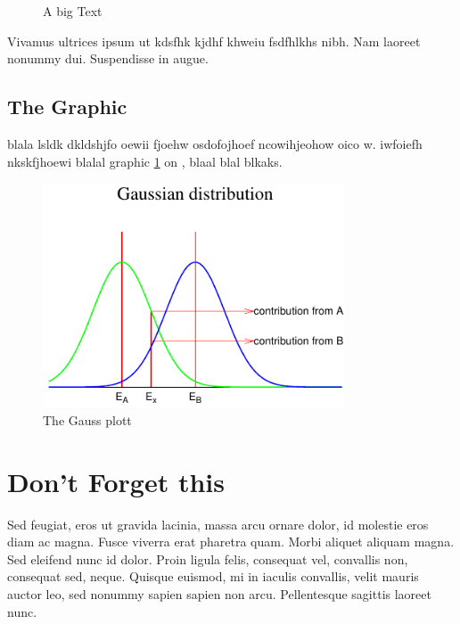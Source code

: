 \documentclass[a4paper,12pt]{book}
\begin{document}
\begin{figure}[hbtp]
\begin{center}
\end{center}
\caption{A big Text}
\end{figure}

Vivamus ultrices ipsum ut
kdsfhk kjdhf khweiu fsdfhlkhs
nibh. Nam laoreet nonummy dui. Suspendisse in augue. 

\section{The Graphic}

blala lsldk dkldshjfo oewii fjoehw osdofojhoef ncowihjeohow oico w. iwfoiefh
nkskfjhoewi blalal graphic \ref{fig:gauss} on \pageref{fig:gauss}, blaal
blal blkaks.

\begin{figure}[hbtp]
\begin{center}
\includegraphics[width=0.8\textwidth]{gauss}
\end{center}
\caption{The Gauss plott}
\label{fig:gauss}
\end{figure}

\appendix

\chapter{Don't Forget this}

Sed feugiat, eros ut gravida lacinia, massa arcu ornare dolor, id
molestie eros diam ac magna. Fusce viverra erat pharetra quam. Morbi
aliquet aliquam magna. Sed eleifend nunc id dolor. Proin ligula felis,
consequat vel, convallis non, consequat sed, neque. Quisque euismod,
mi in iaculis convallis, velit mauris auctor leo, sed nonummy sapien
sapien non arcu. Pellentesque sagittis laoreet nunc.
\end{document}
